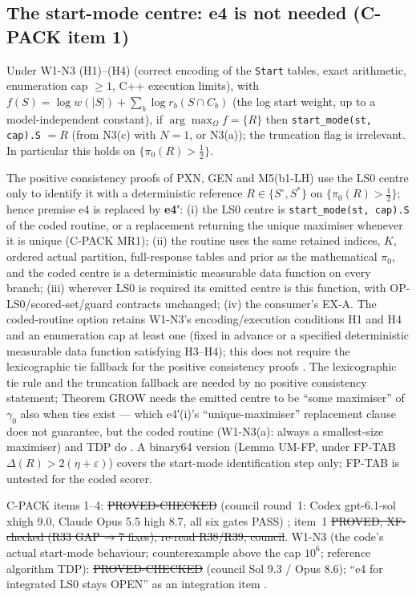 \subsection{The start-mode centre: e4 is not needed (C-PACK item 1)}\label{sec:e4}
\begin{lemma}[UM]\label{lem:UM}
Under W1-N3 (H1)--(H4) (correct encoding of the \texttt{Start} tables, exact arithmetic, enumeration cap $\ge1$, C++ execution limits), with $f(S)=\log w(|S|)+\sum_b\log r_b(S\cap C_b)$ (the log start weight, up to a model-independent constant), if $\arg\max_{\Omega}f=\{R\}$ then \texttt{start\_mode(st, cap).S} $=R$ (from N3(c) with $N=1$, or N3(a)); the truncation flag is irrelevant. In particular this holds on $\{\pi_0(R)>\frac12\}$.
\end{lemma}
The positive consistency proofs of PXN, GEN and M5(b1-LH) use the LS0 centre only to identify it with a deterministic reference $R\in\{S^\circ,S^*\}$ on $\{\pi_0(R)>\frac12\}$; hence premise e4 is replaced by
\textbf{e4′}: (i) the LS0 centre is \texttt{start\_mode(st, cap).S} of the coded routine, or a replacement returning the unique maximiser whenever it is unique (C-PACK MR1); (ii) the routine uses the same retained indices, $K$, ordered actual partition, full-response tables and prior as the mathematical $\pi_0$, and the coded centre is a deterministic measurable data function on every branch; (iii) wherever LS0 is required its emitted centre is this function, with OP-LS0/scored-set/guard contracts unchanged; (iv) the consumer's EX-A. The coded-routine option retains W1-N3's encoding/execution conditions H1 and H4 and an enumeration cap at least one (fixed in advance or a specified deterministic measurable data function satisfying H3--H4); this does not require the lexicographic tie fallback for the positive consistency proofs . The lexicographic tie rule and the truncation fallback are needed by no positive consistency statement; Theorem GROW needs the emitted centre to be ``some maximiser'' of $\gamma_0$ also when ties exist — which e4′(i)'s ``unique-maximiser'' replacement clause does not guarantee, but the coded routine (W1-N3(a): always a smallest-size maximiser) and TDP do . A binary64 version (Lemma UM-FP, under FP-TAB $\Delta(R)>2(\eta+\varepsilon)$) covers the start-mode identification step only; FP-TAB is untested for the coded scorer.
\begin{statusbox}
C-PACK items 1--4: \st{PROVED-CHECKED} (council round~1: Codex gpt-6.1-sol xhigh 9.0, Claude Opus 5.5 high 8.7, all six gates PASS) ; item~1 \st{PROVED; XF-checked (R33 GAP → 7 fixes), re-read R38/R39, council}. W1-N3 (the code's actual start-mode behaviour; counterexample above the cap $10^6$; reference algorithm TDP): \st{PROVED-CHECKED} (council Sol 9.3 / Opus 8.6); ``e4 for integrated LS0 stays OPEN'' as an integration item .
\end{statusbox}

